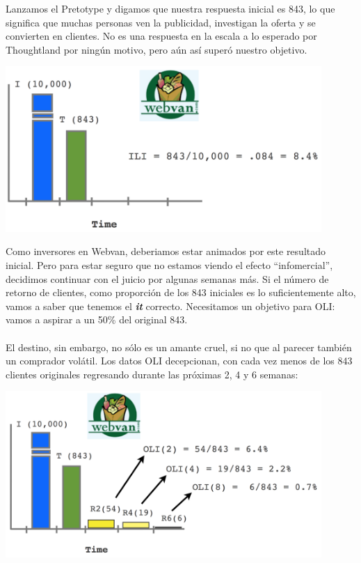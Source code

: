 \documentclass{article}
\begin{document}
Lanzamos el Pretotype y digamos que nuestra respuesta inicial es 843, lo que significa que muchas personas ven la publicidad, investigan la oferta y se convierten en clientes. No es una respuesta en la escala a lo esperado por Thoughtland por ning\'un motivo, pero a\'un as\'i super\'o nuestro objetivo.

\begin{center}
    \includegraphics[width=0.9\textwidth]{ILI_weban}
\end{center}

Como inversores en Webvan, deberiamos estar animados por este resultado inicial. Pero para estar seguro que no estamos viendo el efecto ``infomercial'', decidimos continuar con el juicio por algunas semanas m\'as. Si el n\'umero de retorno de clientes, como proporci\'on de los 843 iniciales es lo suficientemente alto, vamos a saber que tenemos el \textbf{\textit{it}} correcto. Necesitamos un objetivo para OLI: vamos a aspirar a un 50\% del original 843.
\\ \\
El destino, sin embargo, no s\'olo es un amante cruel, si no que al parecer tambi\'en un comprador vol\'atil. Los datos OLI decepcionan, con cada vez menos de los 843 clientes originales regresando durante las pr\'oximas 2, 4 y 6 semanas:

\begin{center}
    \includegraphics[width=0.9\textwidth]{OLI_weban}
\end{center}
\end{document}
